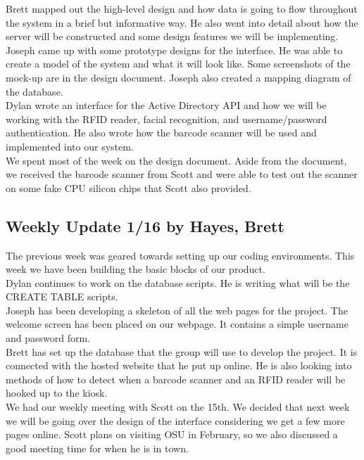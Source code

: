 \documentclass[10pt, onecolumn, twoside, peerreview]{IEEEtran}
\begin{document}
Brett mapped out the high-level design and how data is going to flow throughout the system in a brief but informative way. He also went into detail about how the server will be constructed and some design features we will be implementing.​\\

Joseph came up with some prototype designs for the interface. He was able to create a model of the system and what it will look like. Some screenshots of the mock-up are in the design document. Joseph also created a mapping diagram of the database.\\

Dylan wrote an interface for the Active Directory API and how we will be working with the RFID reader, facial recognition, and username/password authentication. He also wrote how the barcode scanner will be used and implemented into our system.\\

We spent most of the week on the design document. Aside from the document, we received the barcode scanner from Scott and were able to test out the scanner on some ​fake CPU silicon chips that Scott also provided.

\subsection{Weekly Update 1/16 by Hayes, Brett}
​The previous week was geared towards setting up our coding environments. This week we have been building the basic blocks of our product.\\

Dylan continues to work on the database scripts. He is ​writing what will be the CREATE TABLE scripts.\\

Joseph has been developing a skeleton of all the web pages for the project. The welcome screen has been placed on our webpage. It contains a simple username and password form.\\

Brett has set up the database that the group will use to develop the project. It is connected with the hosted website that he put up online. He is also looking into methods of how to detect when a barcode scanner and an RFID reader will be hooked up to the kiosk.\\

We had our weekly meeting with Scott on the 15th. We decided that next week we will be going over the design of the interface considering we get a few more pages online. Scott plans on visiting OSU in February, so we also discussed a good meeting time for when he is in town.
\end{document}
